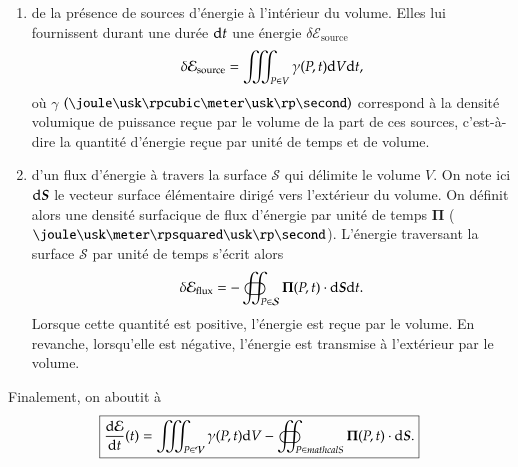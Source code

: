 \begin{enumerate}
	\item de la présence de sources d'énergie à l'intérieur
	  du volume. Elles lui fournissent durant une durée $\mathrm{d}t$ une énergie
	  $\delta \mathcal{E}_\mathrm{source}$
	  \begin{equation*}
		  \delta \mathcal{E}_\mathrm{source} = 
		  \iiint_{P \in V} \gamma(P, t) \mathrm{d}V \mathrm{d}t,
	  \end{equation*}
	  où $\gamma$ $(\joule \usk \rpcubic \meter \usk \rp \second)$ 
	  correspond à la densité volumique de puissance 
	  reçue par le volume de la part de ces sources, 
	  c'est-à-dire la quantité d'énergie reçue par unité de temps et de 
	  volume.
  	\item d'un flux d'énergie à travers la surface $\mathcal{S}$ qui délimite le volume
    	$V$. On note ici $\ds$ le vecteur surface élémentaire dirigé vers l'extérieur
	du volume. On définit alors une densité surfacique de flux d'énergie 
	par unité de temps $\mathbf{\Pi}$ ($\joule \usk \meter \rpsquared
	\usk \rp \second$). L'énergie traversant la surface $\mathcal{S}$ par unité de 
	temps s'écrit alors
	\begin{equation*}
		\delta \mathcal{E}_\mathrm{flux} = - \oiint_{P \in \mathcal{S}}
		\mathbf{\Pi}(P, t) \cdot \ds \dt.
	\end{equation*}
	Lorsque cette quantité est positive, l'énergie est reçue par le volume.
	En revanche, lorsqu'elle est négative, l'énergie est transmise à l'extérieur
	par le volume.
\end{enumerate}
Finalement, on aboutit à
\begin{equation*}
	\boxed{\dn{\mathcal{E}}{t}(t) = \iiint_{P \in \mathcal{V}} \gamma(P, t) \dV
	- \oiint_{P \in mathcal{S}} \mathbf{\Pi}(P, t) \cdot \ds.}
\end{equation*}

